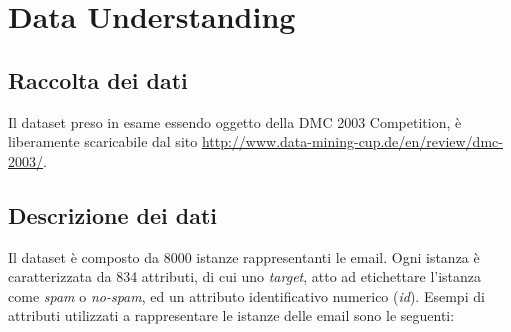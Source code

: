\chapter{Data Understanding}
\section{Raccolta dei dati}
Il dataset preso in esame essendo oggetto della DMC 2003 Competition, è liberamente scaricabile dal sito \url{http://www.data-mining-cup.de/en/review/dmc-2003/}.


\section{Descrizione dei dati}
Il dataset è composto da 8000 istanze rappresentanti le email. Ogni istanza è caratterizzata da 834 attributi, di cui uno \textit{target}, atto ad etichettare l'istanza come \textit{spam} o \textit{no-spam}, ed un attributo identificativo numerico (\textit{id}). Esempi di attributi utilizzati a rappresentare le istanze delle email sono le seguenti:

